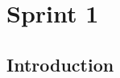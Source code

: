 \chapter{Sprint 1}

\newpage

\lhead{\leftmark}
\cfoot{\thepage}


\parindent=0.5in


\section{Introduction}